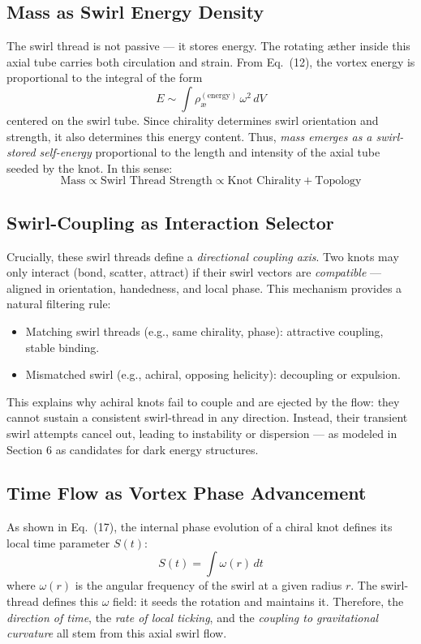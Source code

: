 \documentclass[a4paper,12pt]{article}
\begin{document}
    \subsection{Mass as Swirl Energy Density}

    The swirl thread is not passive — it stores energy. The rotating æther inside this axial tube carries both circulation and strain. From Eq.~(12), the vortex energy is proportional to the integral of the form
    \[
        E \sim \int \rho_{\text{\ae}}^{(\text{energy})} \, \omega^2 \, dV
    \]
    centered on the swirl tube. Since chirality determines swirl orientation and strength, it also determines this energy content. Thus, \textit{mass emerges as a swirl-stored self-energy} proportional to the length and intensity of the axial tube seeded by the knot. In this sense:
    \[
        \text{Mass} \propto \text{Swirl Thread Strength} \propto \text{Knot Chirality} + \text{Topology}
    \]

    \subsection{Swirl-Coupling as Interaction Selector}

    Crucially, these swirl threads define a \textit{directional coupling axis}. Two knots may only interact (bond, scatter, attract) if their swirl vectors are \textit{compatible} — aligned in orientation, handedness, and local phase. This mechanism provides a natural filtering rule:
    \begin{itemize}
        \item Matching swirl threads (e.g., same chirality, phase): attractive coupling, stable binding.
        \item Mismatched swirl (e.g., achiral, opposing helicity): decoupling or expulsion.
    \end{itemize}
    This explains why achiral knots fail to couple and are ejected by the flow: they cannot sustain a consistent swirl-thread in any direction. Instead, their transient swirl attempts cancel out, leading to instability or dispersion — as modeled in Section 6 as candidates for dark energy structures.

    \subsection{Time Flow as Vortex Phase Advancement}

    As shown in Eq.~(17), the internal phase evolution of a chiral knot defines its local time parameter $S(t)$:
    \[
        S(t) = \int \omega(r) \, dt
    \]
    where $\omega(r)$ is the angular frequency of the swirl at a given radius $r$. The swirl-thread defines this $\omega$ field: it seeds the rotation and maintains it. Therefore, the \textit{direction of time}, the \textit{rate of local ticking}, and the \textit{coupling to gravitational curvature} all stem from this axial swirl flow.
\end{document}
